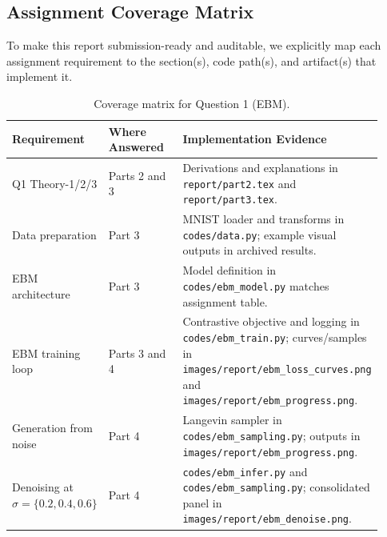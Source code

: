 \subsection{Assignment Coverage Matrix}

To make this report submission-ready and auditable, we explicitly map each
assignment requirement to the section(s), code path(s), and artifact(s) that
implement it.

\begin{table}[H]
\centering
\caption{Coverage matrix for Question 1 (EBM).}
\label{tab:coverage-q1}
\begin{tabular}{@{}p{0.18\linewidth}p{0.27\linewidth}p{0.47\linewidth}@{}}
\toprule
\textbf{Requirement} & \textbf{Where Answered} & \textbf{Implementation Evidence} \\
\midrule
Q1 Theory-1/2/3 & Parts 2 and 3 & Derivations and explanations in
\texttt{report/part2.tex} and \texttt{report/part3.tex}. \\
Data preparation & Part 3 & MNIST loader and transforms in
\texttt{codes/data.py}; example visual outputs in archived results. \\
EBM architecture & Part 3 & Model definition in \texttt{codes/ebm\_model.py}
matches assignment table. \\
EBM training loop & Parts 3 and 4 & Contrastive objective and logging in
\texttt{codes/ebm\_train.py}; curves/samples in
\texttt{images/report/ebm\_loss\_curves.png} and
\texttt{images/report/ebm\_progress.png}. \\
Generation from noise & Part 4 & Langevin sampler in
\texttt{codes/ebm\_sampling.py}; outputs in
\texttt{images/report/ebm\_progress.png}. \\
Denoising at $\sigma=\{0.2,0.4,0.6\}$ & Part 4 &
\texttt{codes/ebm\_infer.py} and \texttt{codes/ebm\_sampling.py}; consolidated
panel in \texttt{images/report/ebm\_denoise.png}. \\
\bottomrule
\end{tabular}
\end{table}

